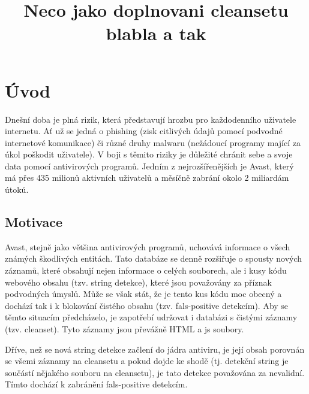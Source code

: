 \documentclass[thesis=M,czech,hidelinks]{FITthesis}[2013/05/06]
\title{Neco jako doplnovani cleansetu blabla a tak}
\begin{document}





\chapter{Úvod}
Dnešní doba je plná rizik, která představují hrozbu pro každodenního uživatele internetu. Ať už se jedná o phishing (zisk citlivých údajů pomocí podvodné internetové komunikace) či různé druhy malwaru (nežádoucí programy mající za úkol poškodit uživatele). V boji s těmito riziky je důležité chránit sebe a svoje data pomocí antivirových programů. Jedním z nejrozšířenějších je Avast, který má přes 435 milionů aktivních uživatelů a měsíčně zabrání okolo 2 miliardám útoků\cite{avast_flier}.

\section{Motivace}
Avast, stejně jako většina antivirových programů, uchovává informace o všech známých škodlivých entitách. Tato databáze se denně rozšiřuje o spousty nových záznamů, které obsahují nejen informace o celých souborech, ale i kusy kódu webového obsahu (tzv. string detekce), které jsou považovány za příznak podvodných úmyslů. Může se však stát, že je tento kus kódu moc obecný a dochází tak i k blokování čistého obsahu (tzv. fals-positive detekcím). Aby se těmto situacím předcházelo, je zapotřebí udržovat i databázi s čistými záznamy (tzv. cleanset). Tyto záznamy jsou převážně HTML a js soubory.

Dříve, než se nová string detekce začlení do jádra antiviru, je její obsah porovnán se všemi záznamy na cleansetu a pokud dojde ke shodě (tj. detekční string je součástí nějakého souboru na cleansetu), je tato detekce považována za nevalidní. Tímto dochází k zabránění fals-positive detekcím. 
\end{document}
